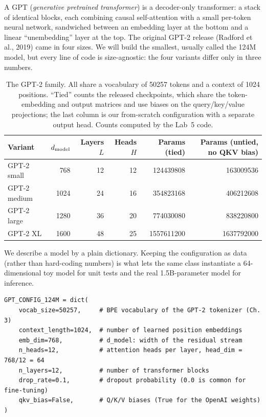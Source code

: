A GPT (\emph{generative pretrained transformer}) is a decoder-only transformer: a stack of
identical blocks, each combining causal self-attention with a small per-token neural network,
sandwiched between an embedding layer at the bottom and a linear ``unembedding'' layer at the
top. The original GPT-2 release (Radford et al., 2019) came in four sizes. We will build the
smallest, usually called the 124M model, but every line of code is size-agnostic: the four
variants differ only in three numbers.

\begin{table}[h]
\centering\small
\begin{tabular}{lrrrrr}
\toprule
Variant & $d_{\text{model}}$ & Layers $L$ & Heads $H$ & Params (tied) & Params (untied, no QKV bias)\\
\midrule
GPT-2 small  & 768  & 12 & 12 & \num{124439808}  & \num{163009536}\\
GPT-2 medium & 1024 & 24 & 16 & \num{354823168}  & \num{406212608}\\
GPT-2 large  & 1280 & 36 & 20 & \num{774030080}  & \num{838220800}\\
GPT-2 XL     & 1600 & 48 & 25 & \num{1557611200} & \num{1637792000}\\
\bottomrule
\end{tabular}
\caption{The GPT-2 family. All share a vocabulary of \num{50257} tokens and a context of
1024 positions. ``Tied'' counts the released checkpoints, which share the token-embedding and
output matrices and use biases on the query/key/value projections; the last column is our
from-scratch configuration with a separate output head. Counts computed by the Lab~5 code.}
\label{tab:gpt:sizes}
\end{table}

We describe a model by a plain dictionary. Keeping the configuration as data (rather than
hard-coding numbers) is what lets the same class instantiate a 64-dimensional toy model for
unit tests and the real 1.5B-parameter model for inference.

\begin{lstlisting}[caption={The configuration that defines GPT-2 small in our code.},label={lst:gpt:config}]
GPT_CONFIG_124M = dict(
    vocab_size=50257,     # BPE vocabulary of the GPT-2 tokenizer (Ch. 3)
    context_length=1024,  # number of learned position embeddings
    emb_dim=768,          # d_model: width of the residual stream
    n_heads=12,           # attention heads per layer, head_dim = 768/12 = 64
    n_layers=12,          # number of transformer blocks
    drop_rate=0.1,        # dropout probability (0.0 is common for fine-tuning)
    qkv_bias=False,       # Q/K/V biases (True for the OpenAI weights)
)
\end{lstlisting}

